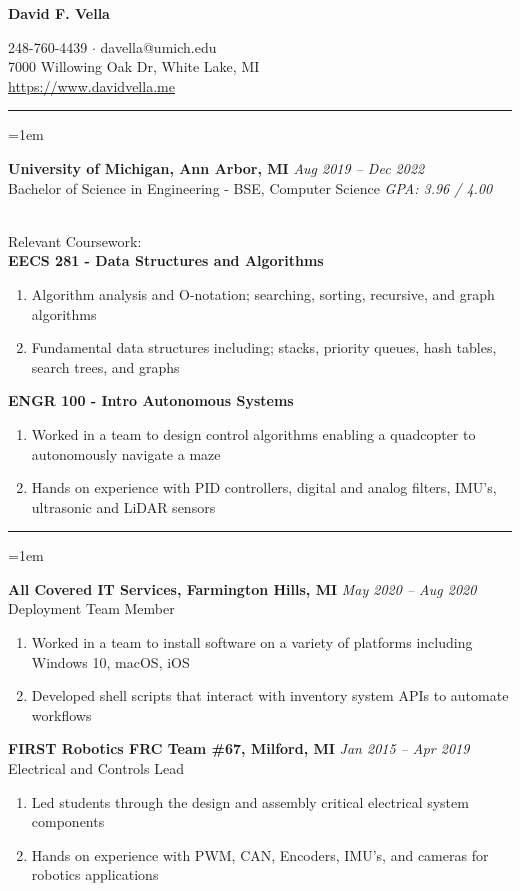 \documentclass[12pt]{article}
\newcommand{\rheader}[1] { 
    \noindent{ 
        \large 
        \textbf{#1} 
        \par 
    }
    \vspace{-10pt}
    \noindent 
    \rule{7.5in}{0.5pt} 
}
\newcommand{\rdate}[1] {
    \hfill 
    \textit{#1}
}
\newcommand{\ritem} {
    \vspace{-10pt} 
    \item
}
\newcommand{\rurl}[1] {
	\textcolor{blue} {
        \small{
            \uline{
                \url{#1}
            }
        }
    }
}
\newenvironment{rsection} {
    \vspace{-5pt}
    \par 
    \medskip
    \leftskip=1em
    \noindent 
    \ignorespaces
} {
    \par 
    \medskip
    \vspace{5pt}
}
\newenvironment{rlist} {
    \begin{enumerate}[leftmargin=0.5in, label=$\bullet$]
} {
    \end{enumerate}
    \vspace{-10pt}
}
\begin{document}


\begin{center} %
    {\Large \textbf{David F. Vella} \par}
    \vspace{5pt}
    248-760-4439 $\cdot$ davella@umich.edu \\
    7000 Willowing Oak Dr, White Lake, MI \\
    \rurl{https://www.davidvella.me}
\end{center}
\vspace{-10pt}


\rheader{EDUCATION}
\begin{rsection}
    \textbf{University of Michigan, Ann Arbor, MI} \rdate{Aug 2019 -- Dec 2022} \\
    Bachelor of Science in Engineering - BSE, Computer Science \rdate{GPA: 3.96 / 4.00}
    \vspace{5pt} \\
    \noindent Relevant Coursework: \\
    \textbf{EECS 281 - Data Structures and Algorithms}
    \begin{rlist}
        \ritem Algorithm analysis and O-notation; searching, sorting, recursive, and graph algorithms
        \ritem Fundamental data structures including; stacks, priority queues, hash tables, search trees, and graphs
    \end{rlist}
    \textbf{ENGR 100 - Intro Autonomous Systems}
    \begin{rlist}
        \ritem Worked in a team to design control algorithms enabling a quadcopter to autonomously navigate a maze
        \ritem Hands on experience with PID controllers, digital and analog filters, IMU's, ultrasonic and LiDAR sensors
    \end{rlist}
\end{rsection}


\rheader{EXPERIENCE}
\begin{rsection}
    \textbf{All Covered IT Services, Farmington Hills, MI} \rdate{May 2020 -- Aug 2020} \\
    Deployment Team Member
    \begin{rlist}
        \ritem Worked in a team to install software on a variety of platforms including Windows 10, macOS, iOS
        \ritem Developed shell scripts that interact with inventory system APIs to automate workflows
    \end{rlist}
    \vspace{5pt}
    \textbf{FIRST Robotics FRC Team \#67, Milford, MI} \rdate{Jan 2015 -- Apr 2019} \\
    Electrical and Controls Lead
    \begin{rlist}
        \ritem Led students through the design and assembly critical electrical system components
        \ritem Hands on experience with PWM, CAN, Encoders, IMU's, and cameras for robotics applications
    \end{rlist}
\end{rsection}
\end{document}
